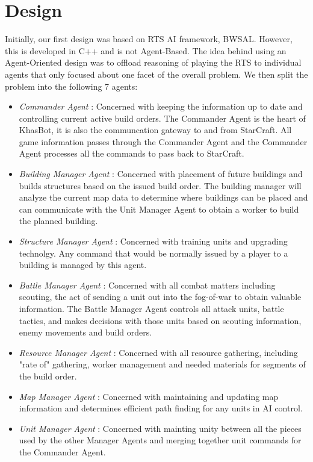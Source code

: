 \documentclass[letterpaper]{article}
\begin{document}
\section{Design}
Initially, our first design was based on RTS AI framework, BWSAL.  However, this is developed in C++ and is not Agent-Based. The idea behind using an Agent-Oriented design was to offload reasoning of playing the RTS to individual agents that only focused about one facet of the overall problem.  We then split the problem into the following 7 agents:
\begin{itemize}
\item \emph{Commander Agent} : Concerned with keeping the information up to date and controlling current active build orders.  The Commander Agent is the heart of KhasBot, it is also the communcation gateway to and from StarCraft.  All game information passes through the Commander Agent and the Commander Agent processes all the commands to pass back to StarCraft.
\item \emph{Building Manager Agent} :  Concerned with placement of future buildings and builds structures based on the issued build order.  The building manager will analyze the current map data to determine where buildings can be placed and can communicate with the Unit Manager Agent to obtain a worker to build the planned building.
\item \emph{Structure Manager Agent} : Concerned with training units and upgrading technolgy.  Any command that would be normally issued by a player to a building is managed by this agent.
\item \emph{Battle Manager Agent} : Concerned with all combat matters including scouting, the act of sending a unit out into the fog-of-war to obtain valuable information.  The Battle Manager Agent controls all attack units, battle tactics, and makes decisions with those units based on scouting information, enemy movements and build orders.
\item \emph{Resource Manager Agent} : Concerned with all resource gathering, including "rate of" gathering, worker management and needed materials for segments of the build order.
\item \emph{Map Manager Agent} : Concerned with maintaining and updating map information and determines efficient path finding for any units in AI control.
\item \emph{Unit Manager Agent} : Concerned with mainting unity between all the pieces used by the other Manager Agents and merging together unit commands for the Commander Agent.
\end{itemize}
\end{document}

